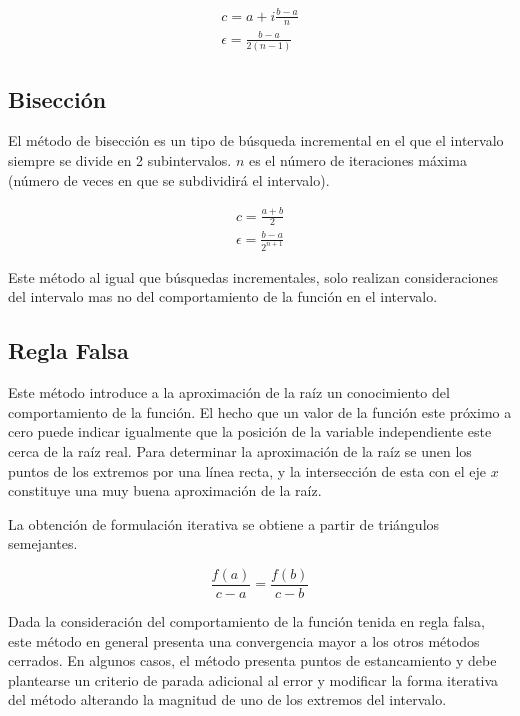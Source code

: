 \documentclass[letterpaper,10pt,oneside]{sphinxmanual}
\theoremstyle{plain}%
\theoremstyle{definition}%
\theoremstyle{remark}%
\begin{document}
\begin{eqnarray}
 c=a+i\frac{b-a}{n} \label{bincr}\\
 \epsilon = \frac{b-a}{2(n-1)} \nonumber
\end{eqnarray}

\subsection{Bisección}
\noindent El método de bisección es un tipo de búsqueda incremental en el que el intervalo siempre se divide en 2 subintervalos. $n$ es el número de iteraciones máxima (número de veces en que se subdividirá el intervalo).\medskip

\begin{eqnarray}
 c=\frac{a+b}{2} \label{bis}\\
 \epsilon = \frac{b-a}{2^{n+1}} \nonumber
\end{eqnarray}

\noindent Este método al igual que búsquedas incrementales, solo realizan consideraciones del intervalo mas no del comportamiento de la función en el intervalo.\medskip

\subsection{Regla Falsa}
Este método introduce a la aproximación de la raíz un conocimiento del comportamiento de la función. El hecho que un valor de la función este próximo a cero puede indicar igualmente que la posición de la variable independiente este cerca de la raíz real. Para determinar la aproximación de la raíz se unen los puntos de los extremos por una línea recta, y la intersección de esta con el eje $x$ constituye una muy buena aproximación de la raíz.\medskip

\noindent La obtención de formulación iterativa se obtiene a partir de triángulos semejantes.\medskip

\begin{equation}
\frac{f(a)}{c-a}=\frac{f(b)}{c-b} \label{regfal}
\end{equation}

\noindent Dada la consideración del comportamiento de la función tenida en regla falsa, este método en general presenta una convergencia mayor a los otros métodos cerrados. En algunos casos, el método presenta puntos de estancamiento y debe plantearse un criterio de parada adicional al error y modificar la forma iterativa del método alterando la magnitud de uno de los extremos del intervalo.\medskip
\end{document}
